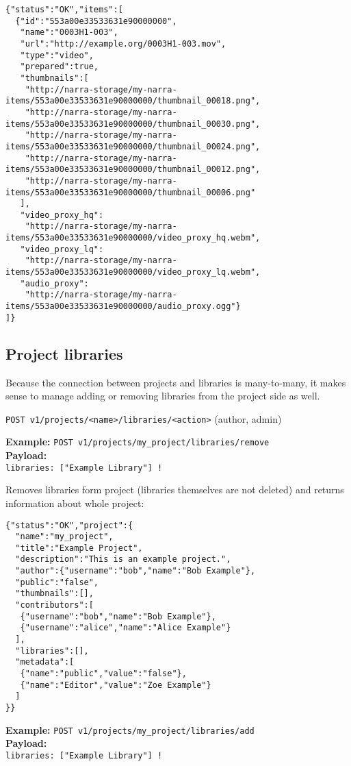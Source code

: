 \documentclass{book}
\newcommand{\request}[2]{{\color{blue}\texttt{#1} (#2)}}
\newcommand{\reqpost}[2]{{\color{blue}\textbf{Example:} \texttt{#1}\\\textbf{Payload:}\\ \texttt{#2}}}
\newcommand{\required}{{\color{red}!}}
\begin{document}
\begin{verbatim}
{"status":"OK","items":[
  {"id":"553a00e33533631e90000000",
   "name":"0003H1-003",
   "url":"http://example.org/0003H1-003.mov",
   "type":"video",
   "prepared":true,
   "thumbnails":[
    "http://narra-storage/my-narra-items/553a00e33533631e90000000/thumbnail_00018.png",
    "http://narra-storage/my-narra-items/553a00e33533631e90000000/thumbnail_00030.png",
    "http://narra-storage/my-narra-items/553a00e33533631e90000000/thumbnail_00024.png",
    "http://narra-storage/my-narra-items/553a00e33533631e90000000/thumbnail_00012.png",
    "http://narra-storage/my-narra-items/553a00e33533631e90000000/thumbnail_00006.png"
   ],
   "video_proxy_hq":
    "http://narra-storage/my-narra-items/553a00e33533631e90000000/video_proxy_hq.webm",
   "video_proxy_lq":
    "http://narra-storage/my-narra-items/553a00e33533631e90000000/video_proxy_lq.webm",
   "audio_proxy":
    "http://narra-storage/my-narra-items/553a00e33533631e90000000/audio_proxy.ogg"}
]}
\end{verbatim}

\subsection{Project libraries}
Because the connection between projects and libraries is many-to-many, it makes sense to manage adding or removing libraries from the project side as well.

\request{POST v1/projects/<name>/libraries/<action>}{author, admin}

\reqpost{POST v1/projects/my\_project/libraries/remove}{libraries: ["Example Library"] \required}

Removes libraries form project (libraries themselves are not deleted) and returns information about whole project:

\begin{verbatim}
{"status":"OK","project":{
  "name":"my_project",
  "title":"Example Project",
  "description":"This is an example project.",
  "author":{"username":"bob","name":"Bob Example"},
  "public":"false",
  "thumbnails":[],
  "contributors":[
   {"username":"bob","name":"Bob Example"},
   {"username":"alice","name":"Alice Example"}
  ],
  "libraries":[],
  "metadata":[
   {"name":"public","value":"false"},
   {"name":"Editor","value":"Zoe Example"}
  ]
}}
\end{verbatim}

\reqpost{POST v1/projects/my\_project/libraries/add}{libraries: ["Example Library"] \required}
\end{document}
